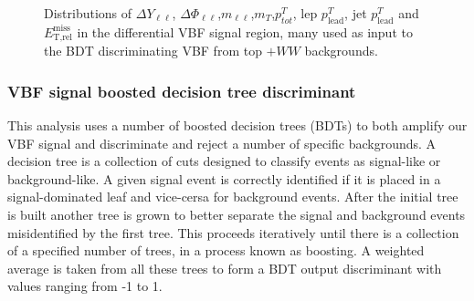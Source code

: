 \begin{figure}[!h]
{  }\hfill
  \hfill
{\caption{Distributions of $\Delta Y_{\ell\ell}$, $\Delta \Phi_{\ell\ell}$,$m_{\ell\ell}$,$m_T$,$p^T_{tot}$, lep $p^T_{\text{lead}}$, jet $p^T_{\text{lead}}$ and $\ensuremath{E_{\text{T,rel}}^{\text{miss}}}$ in the differential VBF signal region, many used as input to the BDT discriminating VBF from top $+WW$ backgrounds.
\label{fig:signalregion}}}
\end{figure}

\subsubsection{VBF signal boosted decision tree discriminant}
This analysis uses a number of boosted decision trees (BDTs) to both amplify our VBF signal and discriminate and reject a number of specific backgrounds. A decision tree is a collection of cuts designed to classify events as signal-like or background-like. A given signal event is correctly identified if it is placed in a signal-dominated leaf and vice-cersa for background events. After the initial tree is built another tree is grown to better separate the signal and background events misidentified by the first tree. This proceeds iteratively until there is a collection of a specified number of trees, in a process known as boosting. A weighted average is taken from all these trees to form a BDT output discriminant with values ranging from -1 to 1.

